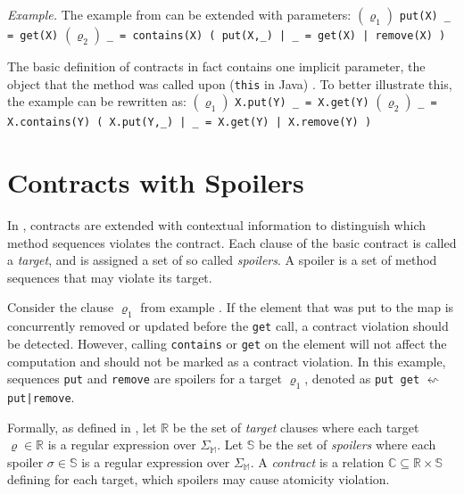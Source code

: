 \emph{Example.} The example from  can be extended with parameters:
 \newline
    $(\varrho_1)$ \texttt{put(X) \_ = get(X)} \newline
    $(\varrho_2)$ \texttt{\_ = contains(X) ( put(X,\_) | \_ = get(X) | remove(X) )}
    \newline

The basic definition of contracts in fact contains one implicit parameter, the
object that the method was called upon (\texttt{this} in Java)
\cite{FITPUB10817}. To better illustrate this, the example can be rewritten as:
 \newline
    $(\varrho_1)$ \texttt{X.put(Y) \_ = X.get(Y)} \newline
    $(\varrho_2)$ \texttt{\_ = X.contains(Y) ( X.put(Y,\_) | \_ = X.get(Y) | X.remove(Y) )}


\section{Contracts with Spoilers}

In \cite{FITPUB11510}, contracts are extended with contextual information to
distinguish which method sequences violates the contract. Each clause of the
basic contract is called a \emph{target}, and is assigned a set of so called
\emph{spoilers}. A spoiler is a set of method sequences that may violate its
target.

Consider the clause $\varrho_1$ from example . If the element that was put to the map is concurrently removed or
updated before the \texttt{get} call, a contract violation should be detected.
However, calling \texttt{contains} or \texttt{get} on the element will not
affect the computation and should not be marked as a contract violation. In this
example, sequences \texttt{put} and \texttt{remove} are spoilers for a target
 $\varrho_1$, denoted as \texttt{put get} $\leftsquigarrow$
\texttt{put|remove}.


Formally, as defined in \cite{FITPUB11510}, let $\mathbb{R}$ be the set of
\emph{target} clauses where each target $\varrho \in \mathbb{R}$ is a regular
expression over $\Sigma_\mathbb{M}$. Let $\mathbb{S}$ be the set of
\emph{spoilers} where each spoiler $\sigma \in \mathbb{S}$ is a regular
expression over $\Sigma_\mathbb{M}$. A \emph{contract} is a relation $\mathbb{C}
\subseteq \mathbb{R} \times \mathbb{S}$ defining for each target, which spoilers
may cause atomicity violation.

